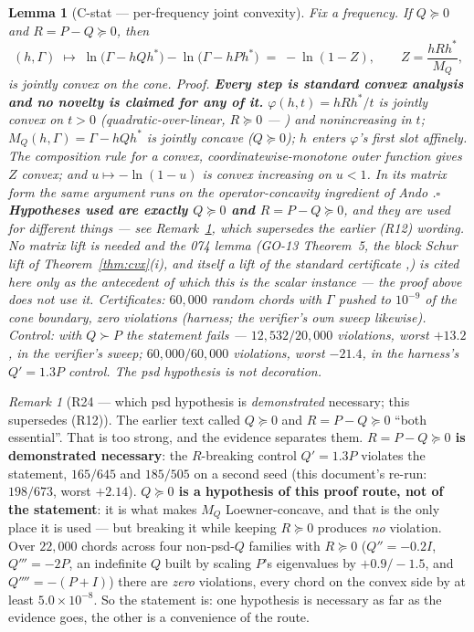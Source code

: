 \documentclass[11pt]{article}
\newtheorem{lemma}{Lemma}
\theoremstyle{definition}
\theoremstyle{remark}
\newtheorem{remark}{Remark}
\begin{document}
\begin{lemma}[C-stat --- per-frequency joint convexity]
\label{lem:cstat}
Fix a frequency. If $Q\succeq0$ and $R=P-Q\succeq0$, then
\[
(h,\Gamma)\;\longmapsto\;
\ln\bigl(\Gamma-hQh^\ast\bigr)-\ln\bigl(\Gamma-hPh^\ast\bigr)
\;=\;-\ln(1-Z),\qquad Z=\frac{hRh^\ast}{M_Q},
\]
is jointly convex on the cone.
\emph{Proof.} \textbf{Every step is standard convex analysis and no
novelty is claimed for any of it.} $\varphi(h,t)=hRh^\ast/t$ is
jointly convex on $t>0$
(quadratic-over-linear, $R\succeq0$ --- \cite[Sec.~3.1.7]{bib:bv04})
and \emph{nonincreasing} in $t$;
$M_Q(h,\Gamma)=\Gamma-hQh^\ast$ is jointly \emph{concave} ($Q\succeq0$);
$h$ enters $\varphi$'s first slot affinely. The composition rule for a
convex, coordinatewise-monotone outer function
\cite[Sec.~3.2.4]{bib:bv04} gives $Z$ convex; and
$u\mapsto-\ln(1-u)$ is convex increasing on $u<1$. In its matrix form
the same argument runs on the operator-concavity ingredient of Ando
\cite{bib:ando79}.\hfill$\square$
\textbf{Hypotheses used are exactly $Q\succeq0$ \emph{and}
$R=P-Q\succeq0$}, and they are used for different things --- see
Remark~\ref{rem:R24}, which supersedes the earlier (R12) wording. No
matrix lift is
needed and the 074 lemma (GO-13 Theorem~5, the block Schur lift of
Theorem~\ref{thm:cvx}(i), and itself a lift of the standard
certificate \cite[Sec.~3.1.7 and 3.2.4]{bib:bv04},\cite{bib:ando79})
is cited here only as the \emph{antecedent}
of which this is the scalar instance --- the proof above does not use
it. \emph{Certificates:} $60{,}000$ random chords with $\Gamma$ pushed
to $10^{-9}$ of the cone boundary, zero violations (harness; the
verifier's own sweep likewise). \emph{Control:} with $Q\succ P$ the
statement \emph{fails} --- $12{,}532/20{,}000$ violations, worst
$+13.2$, in the verifier's sweep; $60{,}000/60{,}000$ violations, worst
$-21.4$, in the harness's $Q'=1.3P$ control. The psd hypothesis is not
decoration.
\end{lemma}

\begin{remark}[R24 --- which psd hypothesis is \emph{demonstrated}
necessary; this supersedes (R12)]
\label{rem:R24}
The earlier text called $Q\succeq0$ and $R=P-Q\succeq0$ ``both
essential''. That is too strong, and the evidence separates them.
\textbf{$R=P-Q\succeq0$ is demonstrated necessary}: the $R$-breaking
control $Q'=1.3P$ violates the statement, $165/645$ and $185/505$ on a
second seed (this document's re-run: $198/673$, worst $+2.14$).
\textbf{$Q\succeq0$ is a hypothesis of this proof route, not of the
statement}: it is what makes $M_Q$ Loewner-concave, and that is the
only place it is used --- but breaking it while keeping $R\succeq0$
produces \emph{no} violation. Over $22{,}000$ chords across four
non-psd-$Q$ families with $R\succeq0$ ($Q''=-0.2I$, $Q'''=-2P$, an
indefinite $Q$ built by scaling $P$'s eigenvalues by $+0.9/-1.5$, and
$Q''''=-(P+I)$) there are \emph{zero} violations, every chord on the
convex side by at least $5.0\times10^{-8}$. So the statement is:
one hypothesis is necessary as far as the evidence goes, the other is a
convenience of the route.
\end{remark}
\end{document}
